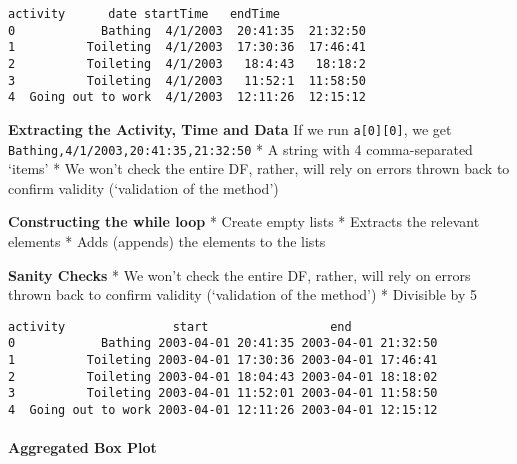 \documentclass[reprint, floatfix, groupaddress, prb]{revtex4-1}
\newcommand{\prompt}[4]{
        \llap{{\color{#2}[#3]: #4}}\vspace{-1.25em}
    }
\begin{document}
            \begin{tcolorbox}[breakable, boxrule=.5pt, size=fbox, pad at break*=1mm, opacityfill=0]
\prompt{Out}{outcolor}{23}{\hspace{3.5pt}}
\begin{Verbatim}[commandchars=\\\{\}]
            activity      date startTime   endTime
0            Bathing  4/1/2003  20:41:35  21:32:50
1          Toileting  4/1/2003  17:30:36  17:46:41
2          Toileting  4/1/2003   18:4:43   18:18:2
3          Toileting  4/1/2003   11:52:1  11:58:50
4  Going out to work  4/1/2003  12:11:26  12:15:12
\end{Verbatim}
\end{tcolorbox}
        
    \textbf{Extracting the Activity, Time and Data} If we run
\texttt{a{[}0{]}{[}0{]}}, we get
\texttt{\textquotesingle{}Bathing,4/1/2003,20:41:35,21:32:50\textquotesingle{}}
* A string with 4 comma-separated `items' * We won't check the entire
DF, rather, will rely on errors thrown back to confirm validity
(`validation of the method')

\textbf{Constructing the while loop} * Create empty lists * Extracts the
relevant elements * Adds (appends) the elements to the lists

\textbf{Sanity Checks} * We won't check the entire DF, rather, will rely
on errors thrown back to confirm validity (`validation of the method') *
Divisible by 5


            \begin{tcolorbox}[breakable, boxrule=.5pt, size=fbox, pad at break*=1mm, opacityfill=0]
\prompt{Out}{outcolor}{24}{\hspace{3.5pt}}
\begin{Verbatim}[commandchars=\\\{\}]
            activity               start                 end
0            Bathing 2003-04-01 20:41:35 2003-04-01 21:32:50
1          Toileting 2003-04-01 17:30:36 2003-04-01 17:46:41
2          Toileting 2003-04-01 18:04:43 2003-04-01 18:18:02
3          Toileting 2003-04-01 11:52:01 2003-04-01 11:58:50
4  Going out to work 2003-04-01 12:11:26 2003-04-01 12:15:12
\end{Verbatim}
\end{tcolorbox}
        
    \hypertarget{aggregated-box-plot}{%
\paragraph{Aggregated Box Plot}\label{aggregated-box-plot}}
\end{document}
